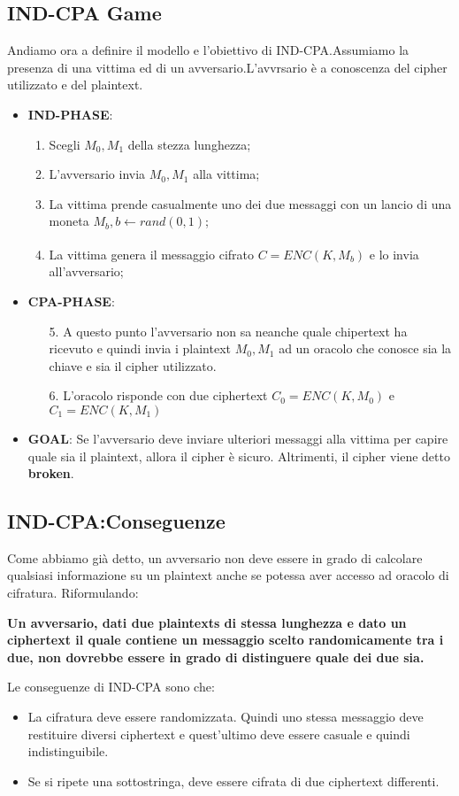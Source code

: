 \documentclass{article}
\theoremstyle{remark}
\begin{document}
\subsection{IND-CPA Game}
Andiamo ora a definire il modello e l'obiettivo di IND-CPA.Assumiamo la presenza di una vittima ed di un avversario.L'avvrsario è a conoscenza del cipher utilizzato e del plaintext.
\begin{itemize}
    \item \textbf{IND-PHASE}:
    \begin{enumerate}
    \item Scegli \(M_0,M_1\) della stezza lunghezza;
    \item L'avversario invia \(M_0,M_1\) alla vittima;
    \item La vittima prende casualmente uno dei due messaggi con un lancio di una moneta \(M_b,b\xleftarrow[]{} rand(0,1)\);
    \item La vittima genera il messaggio cifrato \(C = ENC(K,M_b)\) e lo invia all'avversario;
\end{enumerate}
    \item \textbf{CPA-PHASE}:
    \begin{enumerate}
        \item[5.] A questo punto l'avversario non sa neanche quale chipertext ha ricevuto e quindi invia i plaintext \(M_0,M_1\) ad un oracolo che conosce sia la chiave e sia il cipher utilizzato.
        \item[6.] L'oracolo risponde con due ciphertext \(C_0 = ENC(K,M_0)\) e \(C_1 = ENC(K,M_1)\)
    \end{enumerate}
    \item \textbf{GOAL}: Se l'avversario deve inviare ulteriori messaggi alla vittima per capire quale sia il plaintext, allora il cipher è sicuro. Altrimenti, il cipher viene detto \textbf{broken}.
\end{itemize}
\subsection{IND-CPA:Conseguenze}
Come abbiamo già detto, un avversario non deve essere in grado di calcolare qualsiasi informazione su un plaintext anche se potessa aver accesso ad oracolo di cifratura. Riformulando:
\begin{center}
    \textbf{Un avversario, dati due plaintexts di stessa lunghezza e dato un ciphertext il quale contiene un messaggio scelto randomicamente tra i due, non dovrebbe essere in grado di distinguere quale dei due sia.}
\end{center}
Le conseguenze di IND-CPA sono che:
\begin{itemize}
    \item La cifratura deve essere randomizzata. Quindi uno stessa messaggio deve restituire diversi ciphertext e quest'ultimo deve essere casuale e quindi indistinguibile.
    \item Se si ripete una sottostringa, deve essere cifrata di due ciphertext differenti.
\end{itemize}
\end{document}
